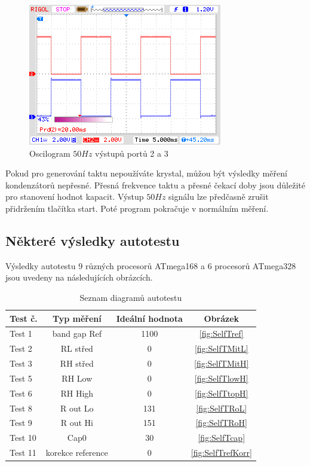 \begin{figure}[H]
\centering
\includegraphics[]{../PNG/Frequency50.png}
\caption{Oscilogram \(50Hz\) výstupů portů 2 a 3}
\label{fig:Frequency50}
\end{figure}

Pokud pro generování taktu nepoužíváte krystal, můžou být výsledky měření kondenzátorů nepřesné.
Přesná frekvence taktu a přesné čekací doby jsou důležité pro stanovení hodnot kapacit.
Výstup  \(50Hz\) signálu lze předčasně zrušit přidržením tlačítka start.
Poté program pokračuje v normálním měření.

\subsection{Některé výsledky autotestu}

Výsledky autotestu 9 různých procesorů ATmega168 a 6 procesorů ATmega328
jsou uvedeny na následujících obrázcích. 

\begin{table}[H]
  \begin{center}
    \begin{tabular}{| l | c | c | c |}
    \hline
Test č. &  Typ měření    & Ideální hodnota & Obrázek \\
    \hline
    \hline
Test 1 & band gap Ref  & 1100 & \ref{fig:SelfTref} \\
    \hline
Test 2 & RL střed & 0 & \ref{fig:SelfTMitL} \\
    \hline
Test 3 & RH střed & 0 & \ref{fig:SelfTMitH} \\
    \hline
Test 5 & RH Low &  0 & \ref{fig:SelfTlowH} \\
    \hline
Test 6 & RH High & 0 & \ref{fig:SelfTtopH} \\
    \hline
Test 8 & R out Lo & 131 & \ref{fig:SelfTRoL} \\
    \hline
Test 9 & R out Hi & 151 & \ref{fig:SelfTRoH} \\
    \hline
Test 10 & Cap0  & 30 & \ref{fig:SelfTcap} \\
    \hline
Test 11 & korekce reference  & 0 & \ref{fig:SelfTrefKorr} \\
    \hline
    \end{tabular}
  \end{center}
  \caption{Seznam diagramů autotestu}
  \label{tab:test_m168} 
\end{table}

